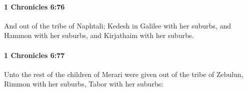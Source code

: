 		\paragraph{1 Chronicles 6:76} %
			\label{1CHRONICLES-6-76}

			And out of the tribe of Naphtali; Kedesh in Galilee with her suburbs, and Hammon with her suburbs, and Kirjathaim with her suburbs.


		\paragraph{1 Chronicles 6:77} %
			\label{1CHRONICLES-6-77}

			Unto the rest of the children of Merari were given out of the tribe of Zebulun, Rimmon with her suburbs, Tabor with her suburbs:


